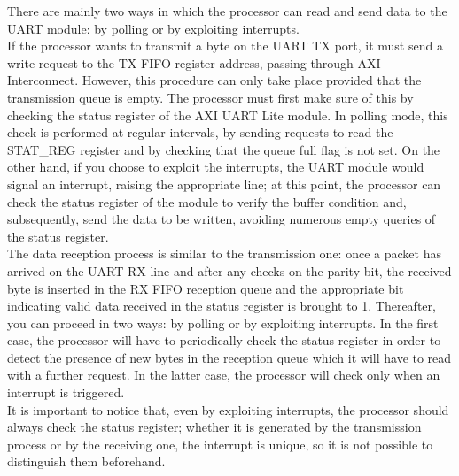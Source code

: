 \documentclass[11pt]{article}
\begin{document}
	There are mainly two ways in which the processor can read and send data to the UART module: by polling or by exploiting interrupts.\\
	If the processor wants to transmit a byte on the UART TX port, it must send a write request to the TX FIFO register address, passing through AXI Interconnect. However, this procedure can only take place provided that the transmission queue is empty. The processor must first make sure of this by checking the status register of the AXI UART Lite module. In polling mode, this check is performed at regular intervals, by sending requests to read the STAT\_REG register and by checking that the queue full flag is not set. On the other hand, if you choose to exploit the interrupts, the UART module would signal an interrupt, raising the appropriate line; at this point, the processor can check the status register of the module to verify the buffer condition  and, subsequently, send the data to be written, avoiding numerous empty queries of the status register. \\
	The data reception process is similar to the transmission one: once a packet has arrived on the UART RX line and after any checks on the parity bit, the received byte is inserted in the RX FIFO reception queue and the appropriate bit indicating valid data received in the status register is brought to 1. Thereafter, you can proceed in two ways: by polling or by exploiting interrupts.
	In the first case, the processor will have to periodically check the status register in order to detect the presence of new bytes in the reception queue which it will have to read with a further request. In the latter case, the processor will check only when an interrupt is triggered. \\
	It is important to notice that, even by exploiting interrupts, the processor should always check the status register;   whether it is generated by the transmission process or by the receiving one, the interrupt is unique, so  it is not possible to distinguish them beforehand.
\end{document}
